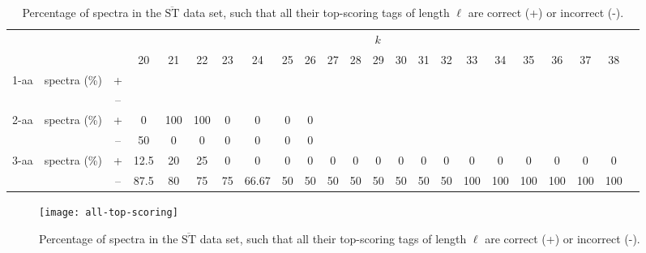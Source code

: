 \documentclass{article}[12pt]
\def\STbar{{\overline{\mathrm{ST}}}}
\begin{document}
\begin{landscape}
\begin{table}[ht]
\vspace{3mm}
\end{table}
\begin{table}[ht]\tiny
\vspace{3mm}
{\centering
\begin{center}
\begin{tabular}{|c|cc|c|c|c|c|c|c|c|c|c|c|c|c|c|c|c|c|c|c|c|c|}
  \hline
  \multicolumn{3}{|c|}{ } & \multicolumn{ 19}{|c|}{$k$} \\
  \cline{4-22 }
  \multicolumn{3}{|c|}{ } 
 & 20 & 21 & 22 & 23 & 24 & 25 & 26 & 27 & 28 & 29 & 30 & 31 & 32 & 33 & 34 & 35 & 36 & 37 & 38\\
\hline
  \multirow{2}{*}{1-aa}& \multirow{2}{*}{spectra (\%)}  &  +
 &  &  &  &  &  &  &  &  &  &  &  &  &  &  &  &  &  &  & \\
 & 
 &  --
 &  &  &  &  &  &  &  &  &  &  &  &  &  &  &  &  &  &  & \\
\hline
  \multirow{2}{*}{2-aa}& \multirow{2}{*}{spectra (\%)}  &  +
 & 0 & 100 & 100 & 0 & 0 & 0 & 0 &  &  &  &  &  &  &  &  &  &  &  & \\
 & 
 &  --
 & 50 & 0 & 0 & 0 & 0 & 0 & 0 &  &  &  &  &  &  &  &  &  &  &  & \\
\hline
  \multirow{2}{*}{3-aa}& \multirow{2}{*}{spectra (\%)}  &  +
 & 12.5 & 20 & 25 & 0 & 0 & 0 & 0 & 0 & 0 & 0 & 0 & 0 & 0 & 0 & 0 & 0 & 0 & 0 & 0\\
 & 
 &  --
 & 87.5 & 80 & 75 & 75 & 66.67 & 50 & 50 & 50 & 50 & 50 & 50 & 50 & 50 & 100 & 100 & 100 & 100 & 100 & 100 \\
  \hline
\end{tabular}
\end{center}
\par}
\centering

\caption{Percentage of spectra in the $\STbar$ data set, such that all their top-scoring tags of length $\ell$ are correct (+) or incorrect (-).}
\label{table:all-top-scoring}

\vspace{3mm}
\end{table}
\end{landscape}

\begin{figure}
  \begin{center}
\texttt{[image: all-top-scoring]}
\end{center}
\caption{Percentage of spectra in the $\STbar$ data set, such that all their top-scoring tags of length $\ell$ are correct (+) or incorrect (-).}
  \label{fig:all-top-scoring}
\end{figure}
\end{document}
